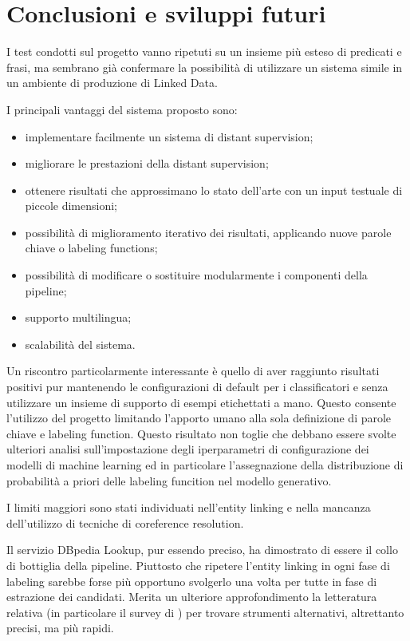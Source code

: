 %
\chapter{Conclusioni e sviluppi futuri}
\label{sec:conclusion}

I test condotti sul progetto vanno ripetuti su un insieme più esteso di predicati e frasi, ma sembrano già confermare la possibilità di utilizzare un sistema simile in un ambiente di produzione di Linked Data.
 
I principali vantaggi del sistema proposto sono: 
\begin{itemize}
\item implementare facilmente un sistema di distant supervision;
\item migliorare le prestazioni della distant supervision;
\item ottenere risultati che approssimano lo stato dell'arte con un input testuale di piccole dimensioni;
\item possibilità di miglioramento iterativo dei risultati, applicando nuove parole chiave o labeling functions;
\item possibilità di modificare o sostituire modularmente i componenti della pipeline;
\item supporto multilingua;
\item scalabilità del sistema.
\end{itemize}

Un riscontro particolarmente interessante è quello di aver raggiunto risultati positivi pur mantenendo le configurazioni di default per i classificatori e senza utilizzare un insieme di supporto di esempi etichettati a mano. Questo consente l'utilizzo del progetto limitando l'apporto umano alla sola definizione di parole chiave e labeling function.
Questo risultato non toglie che debbano essere svolte ulteriori analisi sull'impostazione degli iperparametri di configurazione dei modelli di machine learning ed in particolare l'assegnazione della distribuzione di probabilità a priori delle labeling funcition nel modello generativo. 

I limiti maggiori sono stati individuati nell'entity linking e nella mancanza dell'utilizzo di tecniche di coreference resolution.

Il servizio DBpedia Lookup, pur essendo preciso, ha dimostrato di essere il collo di bottiglia della pipeline. Piuttosto che ripetere l'entity linking in ogni fase di labeling sarebbe forse più opportuno svolgerlo una volta per tutte in fase di estrazione dei candidati. Merita un ulteriore approfondimento la letteratura relativa (in particolare il survey di \citet{Shen2015EntityLW}) per trovare strumenti alternativi, altrettanto precisi, ma più rapidi.

